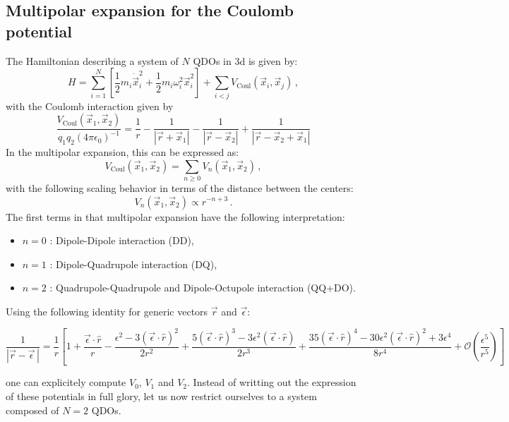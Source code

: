 \documentclass[reprint, amsmath, amssymb, aps, prl]{revtex4-2}
\begin{document}
    \subsection{Multipolar expansion for the Coulomb potential}

        The Hamiltonian describing a system of $N$ QDOs in 3d is given by:
        \begin{equation}
        \label{eq:full_QDO_Hamiltonian}
            H=\sum_{i=1}^N\left[\frac{1}{2}m_i\dot{\vec x}_i^2 + \frac{1}{2}m_i\omega_i^2\vec x_i^2\right] +\sum_{i<j}V_\text{Coul}\left(\vec x_i, \vec x_j\right)\,,
        \end{equation}
        with the Coulomb interaction given by
        \begin{equation*}
            \frac{V_\text{Coul}\left(\vec x_1, \vec x_2\right)}{q_1q_2(4\pi\epsilon_0)^{-1}}=\frac{1}{r} - \frac{1}{|\vec r + \vec x_1|} - \frac{1}{|\vec r - \vec x_2|} + \frac{1}{|\vec r - \vec x_2 + \vec x_1|}
        \end{equation*}
        In the multipolar expansion, this can be expressed as:
        \begin{equation}
            V_\text{Coul}\left(\vec x_1, \vec x_2\right)= \sum_{n\geq 0} V_n\left(\vec x_1, \vec x_2\right)\,,
        \end{equation}
        with the following scaling behavior in terms of the distance between the centers:
        \begin{equation}
            V_n\left(\vec x_1, \vec x_2\right)\propto r^{-n+3}\,.
        \end{equation}
        The first terms in that multipolar expansion have the following interpretation:
        \begin{itemize}
            \item $n=0$ : Dipole-Dipole interaction (DD),
            \item $n=1$ : Dipole-Quadrupole interaction (DQ),
            \item $n=2$ : Quadrupole-Quadrupole and Dipole-Octupole interaction (QQ+DO).
        \end{itemize}
        Using the following identity for generic vectors $\vec r$ and $\vec \epsilon$:
        \begin{widetext}
        \begin{equation}
            \frac{1}{\left|\vec r - \vec\epsilon\,\right|} = \frac{1}{r}\left[1 + \frac{\vec\epsilon\cdot\hat r}{r} - \frac{\epsilon^2 - 3(\vec\epsilon\cdot\hat r)^2}{2r^2}+\frac{5(\vec\epsilon\cdot\hat r)^3-3\epsilon^2(\vec\epsilon\cdot\hat r)}{2r^3}+\frac{35(\vec\epsilon\cdot\hat r)^4-30\epsilon^2(\vec\epsilon\cdot\hat r)^2+3\epsilon^4}{8r^4}+\mathcal O\left(\frac{\epsilon^5}{r^5}\right)\right]
        \end{equation}
        \end{widetext}
        one can explicitely compute $V_0$, $V_1$ and $V_2$. Instead of writting out the expression of these potentials in full glory, let us now restrict ourselves to a system composed of $N=2$ QDOs.
\end{document}
